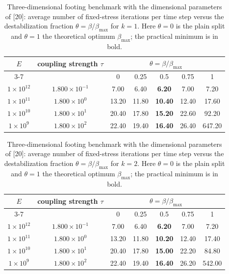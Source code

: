 \begin{table}[ht!]
\centering
\renewcommand{\arraystretch}{1.15}
\begin{tabular}{ccccccc}
\toprule
$E$ & coupling strength $\tau$ & \multicolumn{5}{c}{$\theta = \beta/\beta_{\max}$} \\
\cmidrule(lr){3-7}
 &  & 0 & 0.25 & 0.5 & 0.75 & 1 \\
\midrule
$1 \times 10^{12}$ & $1.800 \times 10^{-1}$ & 7.00 & 6.40 & \textbf{6.20} & 7.00 & 7.20 \\
$1 \times 10^{11}$ & $1.800 \times 10^{0}$ & 13.20 & 11.80 & \textbf{10.40} & 12.40 & 17.60 \\
$1 \times 10^{10}$ & $1.800 \times 10^{1}$ & 20.40 & 17.80 & \textbf{15.20} & 22.60 & 92.20 \\
$1 \times 10^{9}$ & $1.800 \times 10^{2}$ & 22.40 & 19.40 & \textbf{16.40} & 26.40 & 647.20 \\
\bottomrule
\end{tabular}
\caption{Three-dimensional footing benchmark with the dimensional parameters of [20]: average number of fixed-stress iterations per time step versus the destabilization fraction $\theta = \beta/\beta_{\max}$ for $k=1$. Here $\theta = 0$ is the plain split and $\theta = 1$ the theoretical optimum $\beta_{\max}$; the practical minimum is in bold.}
\label{tab:footing_dim_beta_grid_3d_k1}
\end{table}

\begin{table}[ht!]
\centering
\renewcommand{\arraystretch}{1.15}
\begin{tabular}{ccccccc}
\toprule
$E$ & coupling strength $\tau$ & \multicolumn{5}{c}{$\theta = \beta/\beta_{\max}$} \\
\cmidrule(lr){3-7}
 &  & 0 & 0.25 & 0.5 & 0.75 & 1 \\
\midrule
$1 \times 10^{12}$ & $1.800 \times 10^{-1}$ & 7.00 & 6.40 & \textbf{6.20} & 7.00 & 7.20 \\
$1 \times 10^{11}$ & $1.800 \times 10^{0}$ & 13.20 & 11.80 & \textbf{10.20} & 12.40 & 17.40 \\
$1 \times 10^{10}$ & $1.800 \times 10^{1}$ & 20.40 & 17.80 & \textbf{15.00} & 22.20 & 84.80 \\
$1 \times 10^{9}$ & $1.800 \times 10^{2}$ & 22.40 & 19.40 & \textbf{16.40} & 26.20 & 542.00 \\
\bottomrule
\end{tabular}
\caption{Three-dimensional footing benchmark with the dimensional parameters of [20]: average number of fixed-stress iterations per time step versus the destabilization fraction $\theta = \beta/\beta_{\max}$ for $k=2$. Here $\theta = 0$ is the plain split and $\theta = 1$ the theoretical optimum $\beta_{\max}$; the practical minimum is in bold.}
\label{tab:footing_dim_beta_grid_3d_k2}
\end{table}
